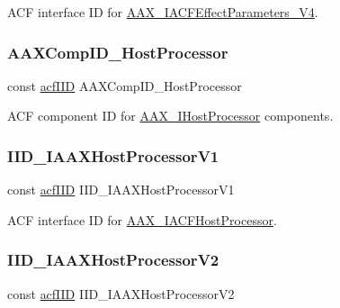 A\+CF interface ID for \mbox{\hyperlink{a01685}{A\+A\+X\+\_\+\+I\+A\+C\+F\+Effect\+Parameters\+\_\+\+V4}}. 

\mbox{\label{a00683_a166521f91afbd59c15651f6cd6c50948}} 
\subsubsection{\texorpdfstring{AAXCompID\_HostProcessor}{AAXCompID\_HostProcessor}}
{\footnotesize\ttfamily const \mbox{\hyperlink{a00269_a59df0b41744eee7a066787aaedf97f67}{acf\+I\+ID}} A\+A\+X\+Comp\+I\+D\+\_\+\+Host\+Processor}



A\+CF component ID for \mbox{\hyperlink{a01833}{A\+A\+X\+\_\+\+I\+Host\+Processor}} components. 

\mbox{\label{a00683_af605d0ce41316c8195aea193a2b50428}} 
\subsubsection{\texorpdfstring{IID\_IAAXHostProcessorV1}{IID\_IAAXHostProcessorV1}}
{\footnotesize\ttfamily const \mbox{\hyperlink{a00269_a59df0b41744eee7a066787aaedf97f67}{acf\+I\+ID}} I\+I\+D\+\_\+\+I\+A\+A\+X\+Host\+Processor\+V1}



A\+CF interface ID for \mbox{\hyperlink{a01693}{A\+A\+X\+\_\+\+I\+A\+C\+F\+Host\+Processor}}. 

\mbox{\label{a00683_a8b54f0c7603c5f10f588d29307769a48}} 
\subsubsection{\texorpdfstring{IID\_IAAXHostProcessorV2}{IID\_IAAXHostProcessorV2}}
{\footnotesize\ttfamily const \mbox{\hyperlink{a00269_a59df0b41744eee7a066787aaedf97f67}{acf\+I\+ID}} I\+I\+D\+\_\+\+I\+A\+A\+X\+Host\+Processor\+V2}



